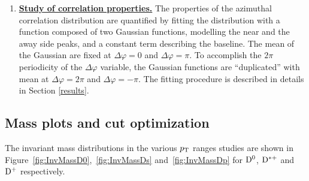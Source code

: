 \begin{enumerate}
\item
\underline{\bf Study of correlation properties.}
The properties of the azimuthal correlation distribution are quantified by
fitting the distribution with a function composed of two Gaussian functions, modelling the near and the away side peaks, and
a constant term describing the baseline. The mean of the Gaussian are fixed at
$\Delta\varphi = 0$ and $\Delta\varphi = \pi$. To accomplish the $2\pi$ periodicity
of the $\Delta\varphi$ variable, the Gaussian functions
are ``duplicated'' with mean at $\Delta\varphi = 2\pi$ and $\Delta\varphi = -\pi$.
The fitting procedure is described in details in Section \ref{results}.



\end{enumerate}

\subsection{Mass plots and cut optimization}
The invariant mass distributions in the various $p_{\rm T}$ ranges studies are shown in Figure~\ref{fig:InvMassD0},~\ref{fig:InvMassDs} and~\ref{fig:InvMassDp} for ${\rm D^0}$, ${\rm D^{*+}}$ and ${\rm D^+}$ respectively.

